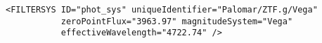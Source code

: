 \noindent
\begingroup\footnotesize
\begin{tcolorbox}
\begin{verbatim}
<FILTERSYS ID="phot_sys" uniqueIdentifier="Palomar/ZTF.g/Vega" 
           zeroPointFlux="3963.97" magnitudeSystem="Vega" 
           effectiveWavelength="4722.74" />
\end{verbatim}
\end{tcolorbox}
\endgroup

